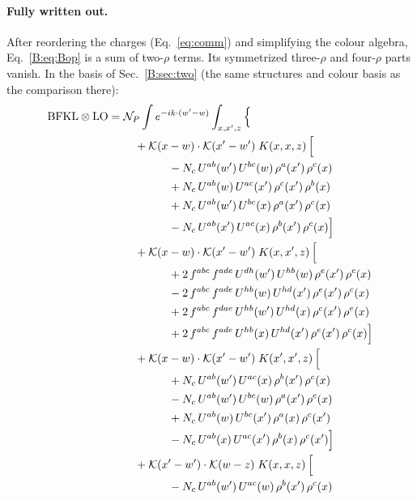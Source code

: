 \documentclass[10pt]{article}
\numberwithin{equation}{section}
\newcommand{\KK}{\mathcal K}
\newcommand{\NP}{\mathcal N_{P}}
\begin{document}
\paragraph{Fully written out.} After reordering the charges (Eq.~\eqref{eq:comm}) and simplifying the colour algebra, Eq.~\eqref{B:eq:Bop} is a sum of two-$\rho$ terms. Its symmetrized three-$\rho$ and four-$\rho$ parts vanish. In the basis of Sec.~\ref{B:sec:two} (the same structures and colour basis as the comparison there):
\begin{align}
\text{BFKL}\otimes\text{LO}={}&\NP\int e^{-ik\cdot(w'-w)}\int_{x,x',z}\Big\{\notag\\
&\quad +\KK(x-w)\cdot\KK(x'-w')\;K(x,x,z)\,\Big[\notag\\
&\qquad\qquad - N_c\,U^{ab}(w')\,U^{bc}(w)\,\rho^{a}(x')\,\rho^{c}(x)\notag\\
&\qquad\qquad +N_c\,U^{ab}(w)\,U^{ac}(x')\,\rho^{c}(x')\,\rho^{b}(x)\notag\\
&\qquad\qquad +N_c\,U^{ab}(w')\,U^{bc}(x)\,\rho^{a}(x')\,\rho^{c}(x)\notag\\
&\qquad\qquad - N_c\,U^{ab}(x')\,U^{ac}(x)\,\rho^{b}(x')\,\rho^{c}(x)\Big]\notag\\
&\quad +\KK(x-w)\cdot\KK(x'-w')\;K(x,x',z)\,\Big[\notag\\
&\qquad\qquad +2\,f^{abc}\,f^{ade}\,U^{dh}(w')\,U^{hb}(w)\,\rho^{e}(x')\,\rho^{c}(x)\notag\\
&\qquad\qquad -2\,f^{abc}\,f^{ade}\,U^{hb}(w)\,U^{hd}(x')\,\rho^{e}(x')\,\rho^{c}(x)\notag\\
&\qquad\qquad +2\,f^{abc}\,f^{dae}\,U^{hb}(w')\,U^{hd}(x)\,\rho^{c}(x')\,\rho^{e}(x)\notag\\
&\qquad\qquad +2\,f^{abc}\,f^{ade}\,U^{hb}(x)\,U^{hd}(x')\,\rho^{e}(x')\,\rho^{c}(x)\Big]\notag\\
&\quad +\KK(x-w)\cdot\KK(x'-w')\;K(x',x',z)\,\Big[\notag\\
&\qquad\qquad +N_c\,U^{ab}(w')\,U^{ac}(x)\,\rho^{b}(x')\,\rho^{c}(x)\notag\\
&\qquad\qquad - N_c\,U^{ab}(w')\,U^{bc}(w)\,\rho^{a}(x')\,\rho^{c}(x)\notag\\
&\qquad\qquad +N_c\,U^{ab}(w)\,U^{bc}(x')\,\rho^{a}(x)\,\rho^{c}(x')\notag\\
&\qquad\qquad - N_c\,U^{ab}(x)\,U^{ac}(x')\,\rho^{b}(x)\,\rho^{c}(x')\Big]\notag\\
&\quad +\KK(x'-w')\cdot\KK(w-z)\;K(x,x,z)\,\Big[\notag\\
&\qquad\qquad - N_c\,U^{ab}(w')\,U^{ac}(w)\,\rho^{b}(x')\,\rho^{c}(x)\notag\\

\end{align}
\end{document}
